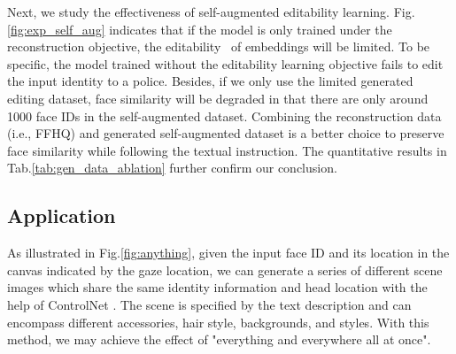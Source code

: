  Next, we study the effectiveness of self-augmented editability learning. Fig.\ref{fig:exp_self_aug} indicates that if the model is only trained under the reconstruction objective, the editability \ of embeddings will be limited. To be specific, the model trained without the editability learning objective fails to edit the input identity to a police. Besides, if we only use the limited generated editing dataset, face similarity will be degraded in that there are only around 1000 face IDs in the self-augmented dataset. Combining the reconstruction data (i.e., FFHQ) and generated self-augmented dataset is a better choice to preserve face similarity while following the textual instruction. The quantitative results in Tab.\ref{tab:gen_data_ablation} further confirm our conclusion.




\subsection{Application}
 As illustrated in Fig.\ref{fig:anything}, given the input face ID and its location in the canvas indicated by the gaze location, we can generate a series of different scene images which share the same identity information and head location with the help of ControlNet \cite{zhang2023adding}. The scene is specified by the text description and can encompass different accessories, hair style, backgrounds, and styles. With this method, we may achieve the effect of "everything and everywhere all at once". 









